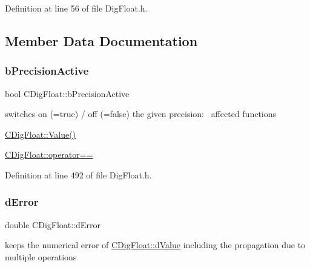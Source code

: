 Definition at line 56 of file Dig\+Float.\+h.



\subsection{Member Data Documentation}
\mbox{\label{classCDigFloat_aa1f6ed0312a2aa6ae5ee2abd195adefc}} 
\subsubsection{\texorpdfstring{b\+Precision\+Active}{bPrecisionActive}}
{\footnotesize\ttfamily bool C\+Dig\+Float\+::b\+Precision\+Active\hspace{0.3cm}{\ttfamily [protected]}}



switches on (=true) / off (=false) the given precision\+:~\newline
 affected functions 


\begin{DoxyItemize}
\item \hyperlink{classCDigFloat_af74b8cd0935294b6371f551b7a1ff640}{C\+Dig\+Float\+::\+Value()}
\item \hyperlink{classCDigFloat_ad8980d984bf2bab71d15b830fd0180a5}{C\+Dig\+Float\+::operator==} 
\end{DoxyItemize}

Definition at line 492 of file Dig\+Float.\+h.

\mbox{\label{classCDigFloat_a25eb3782d1e727ff007a48f8308e3d4d}} 
\subsubsection{\texorpdfstring{d\+Error}{dError}}
{\footnotesize\ttfamily double C\+Dig\+Float\+::d\+Error\hspace{0.3cm}{\ttfamily [protected]}}



keeps the numerical error of \hyperlink{classCDigFloat_a4bbe69e30dd4e20527362493aa9aaf96}{C\+Dig\+Float\+::d\+Value} including the propagation due to multiple operations 



